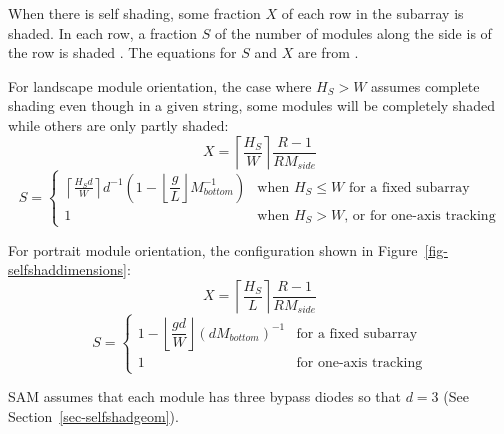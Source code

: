 \documentclass[12pt,letterpaper]{article}
\begin{document}
When there is self shading, some fraction $X$ of each row in the subarray is shaded. In each row, a fraction $S$ of the number of modules along the side is of the row is shaded \citep{deline2013a}. The equations for $S$ and $X$ are from \citet{deline2013b}.

For landscape module orientation, the case where $H_S>W$ assumes complete shading even though in a given string, some modules will be completely shaded while others are only partly shaded: 
\begin{equation}
X = \left\lceil\frac{H_S}{W}\right\rceil \dfrac{R-1}{R M_{side}}
\end{equation}
\[
S=
  \left\{
    \begin{array}{ll}
      \left\lceil \frac{H_S d}{W} \right
      \rceil d^{-1} 
      \left(1-\left\lfloor\dfrac{g}{L}\right\rfloor M^{-1}_{bottom}\right) 
      & \mbox{when $H_S\le W$ for a fixed subarray}\\
      1 
      & \mbox{when $H_S> W$, or for one-axis tracking}
    \end{array}
  \right.
\]

For portrait module orientation, the configuration shown in Figure~\ref{fig-selfshaddimensions}: 
\begin{equation}
X = \left\lceil \frac{H_S}{L} \right\rceil \dfrac{R-1}{R M_{side}}
\end{equation}
\[
S=
 \left\{
     \begin{array}{ll}
      1-\left\lfloor \dfrac{gd}{W}\right\rfloor \left(d M_{bottom}\right)^{-1} 
      & \mbox{for a fixed subarray}\\
      1 
      & \mbox{for one-axis tracking}
    \end{array}
  \right.
\]


SAM assumes that each module has three bypass diodes so that $d=3$ (See  Section~\ref{sec-selfshadgeom}).

\end{document}

